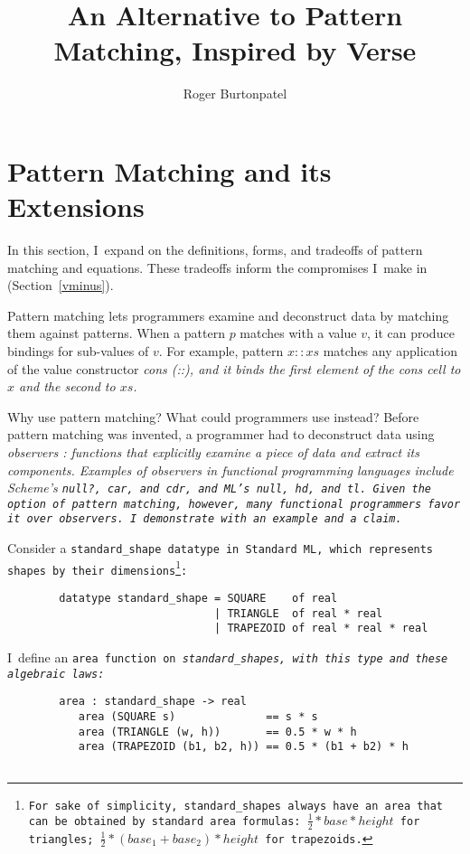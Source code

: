 \documentclass[manuscript,screen,review, 12pt, nonacm]{acmart}
\title{An Alternative to Pattern Matching, Inspired by Verse}
\author{Roger Burtonpatel}
\affiliation{%
  \institution{Tufts University}
  \streetaddress{419 Boston Ave}
  \city{Medford}
  \state{Massachusetts}
  \country{USA}
  \postcode{02155}
}
\begin{document}
\section{Pattern Matching and its Extensions}
\label{pmandextensions}

In this section, I~expand on the definitions, forms, and tradeoffs of pattern
matching and equations. These tradeoffs inform the compromises I~make in
\VMinus (Section~\ref{vminus}).



Pattern matching lets programmers examine and deconstruct data by matching them
against patterns. When a pattern $p$ matches with a value $v$, it can produce
bindings for sub-values of $v$. For example, pattern $x::xs$ matches any 
application of the value constructor \it{cons} (\it{::}), and it binds the first 
element of the cons cell to $x$ and the second to $xs$. 

Why use pattern matching? What could programmers use instead? Before pattern
matching was invented, a programmer had to deconstruct data using \it{observers}
\citep{liskov:abstraction}: functions that explicitly examine a piece of data
and extract its components. Examples of observers in functional programming
languages include Scheme's \tt{null?}, \tt{car}, and \tt{cdr}, and ML's
\tt{null}, \tt{hd}, and \tt{tl}. Given the option of pattern matching, however,
many functional programmers favor it over observers. I~demonstrate with an
example and a claim. 

Consider a \tt{standard\_shape} datatype in Standard ML, which represents shapes
by their dimensions\footnote{For sake of simplicity, \tt{standard\_shape}s
always have an area that can be obtained by standard area formulas: $\frac{1}{2}
* base * height$ for triangles; $\frac{1}{2} * (base_{1} + base_{2}) * height$
for trapezoids.}: 

\medskip 
\begin{minipage}[t]{\textwidth}
    \begin{verbatim}
        datatype standard_shape = SQUARE    of real 
                                | TRIANGLE  of real * real 
                                | TRAPEZOID of real * real * real
\end{verbatim}
\end{minipage}
\medskip 

I~define an \tt{area} function on \it{standard\_shape}s, with this type and these
algebraic laws: 

\medskip 
\begin{minipage}[t]{\textwidth}
    \begin{verbatim}
        area : standard_shape -> real 
           area (SQUARE s)              == s * s 
           area (TRIANGLE (w, h))       == 0.5 * w * h
           area (TRAPEZOID (b1, b2, h)) == 0.5 * (b1 + b2) * h
        
\end{verbatim}
\end{minipage}
\medskip 
\end{document}
